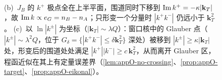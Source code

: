 \begin{figure}[htbp]
{(b)~$J_B$ 的 $k^+$ 极点全在上半平面，围道同时下移到 ${\rm Im}\,k^+=-\kappa|\mathbf k_T|$，故 ${\rm Im}\,k\propto e_G=n_B-n_A$；只形变一个分量时 $|k^+k^-|$ 仍远小于 $\mathbf k_T^2$。
(c)~以 $\ln|k^\pm|$ 为坐标（$|\mathbf k_T|\sim\lambda Q$）：窗口核中的 Glauber 点（$|k^\pm|\sim\lambda^2Q$，位于 $G_\delta=\{|k^+k^-|\le\delta\mathbf k_T^2\}$ 深处）被移到 $|k^\pm|\ge\kappa|\mathbf k_T|$ 处，形变后的围道处处满足 $|k^+||k^-|\ge c\,\mathbf k_T^2$，从而离开 Glauber 区，程函近似在其上有定量误差界（\cref{lem:appO-no-crossing}、\cref{prop:appO-target}、\cref{prop:appO-eikonal}）。}
\label{fig:appO-deformation}
\end{figure}

